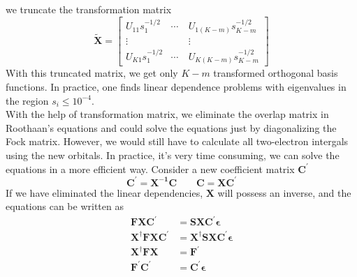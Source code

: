 \documentclass[11pt]{article}
\begin{document}
we truncate the transformation matrix
\begin{equation}
    \mathbf{\tilde{X}}=
    \begin{bmatrix}
        U_{11}s_1^{-1/2}&\cdots&U_{1(K-m)}s_{K-m}^{-1/2}\\
        \vdots&\quad&\vdots\\
        U_{K1}s_{1}^{-1/2}&\cdots&U_{K(K-m)}s_{K-m}^{-1/2}
    \end{bmatrix}
\end{equation}
With this truncated matrix, we get only $K-m$ transformed orthogonal basis functions. In practice,
one finds linear dependence problems with eigenvalues in the region $s_i \leq {10}^{-4}$.\\
With the help of transformation matrix, we eliminate the overlap matrix in Roothaan's equations and could
solve the equations just by diagonalizing the Fock matrix. However, we would still have to calculate all
two-electron intergals using the new orbitals. In practice, it's very time consuming, we can solve the equations
in a more efficient way. Consider a new coefficient matrix $\mathbf{C^{'}}$
\begin{equation}
    \mathbf{C^{'}}=\mathbf{X^{-1}C}\qquad\mathbf{C}=\mathbf{XC^{'}}
\end{equation}
If we have eliminated the linear dependencies, $\mathbf{X}$ will possess an inverse, and the equations can be written as
\begin{equation}
    \begin{split}
        \mathbf{FXC^{'}}&=\mathbf{SXC^{'}\epsilon}\\
        \mathbf{X^\dagger FXC^{'}}&=\mathbf{X^\dagger SXC^{'}\epsilon}\\
        \mathbf{X^\dagger FX}&=\mathbf{F^{'}}\\
        \mathbf{F^{'}C^{'}}&=\mathbf{C^{'}\epsilon}
    \end{split}
\end{equation}
\end{document}
